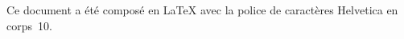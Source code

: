 \thispagestyle{empty}
Ce document a été composé en \LaTeX{} avec la police de caractères Helvetica en corps~10.%
